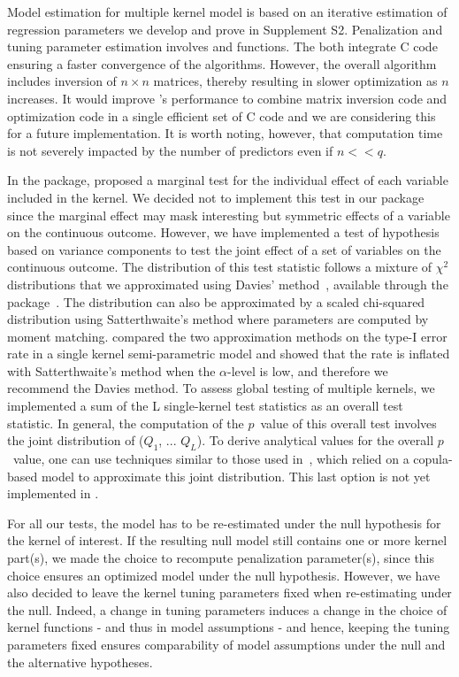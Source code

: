 Model estimation for multiple kernel model is based on an iterative estimation of regression parameters we develop and prove in Supplement S2. Penalization and tuning parameter estimation involves  and  functions. The both integrate C code ensuring a faster convergence of the algorithms. However, the overall  algorithm includes inversion of $n \times n$ matrices, thereby resulting in slower optimization as $n$ increases. It would improve 's performance to combine matrix inversion code and optimization code in a single efficient set of C code and we are considering this for a future implementation.  It is worth noting, however, that computation time is not severely impacted by the number of predictors even if $n << q$.



In the  package, \cite{hainmueller2013kernel} proposed a marginal test for the individual effect of each variable included in the kernel. We decided not to implement this test in our package since the marginal effect may mask interesting but symmetric effects of a variable on the continuous outcome. However, we have implemented a test of hypothesis based on variance components to test the joint effect of a set of variables on the continuous outcome. The distribution of this test statistic follows a mixture of $\chi^2$ distributions that we approximated using Davies' method~\citep{davies1980distribution}, available through the  package~\citep{CQFpackage, compQuadForm}. The distribution can also be approximated by a scaled chi-squared distribution using Satterthwaite's method where parameters are computed by moment matching. \cite{schifano2012snp} compared the two approximation methods on the type-I error rate in a single kernel semi-parametric model and showed that the rate is inflated with Satterthwaite's method when the $\alpha$-level is low, and therefore we recommend the Davies method. To assess global testing of multiple kernels, we implemented a sum of the L single-kernel test statistics as an overall test statistic. In general, the computation of the $p$~value of this overall test involves the joint distribution of ($Q_1$, ... $Q_L$). To derive analytical values for the overall $p$~value, one can use techniques similar to those used in~\cite{sun2018}, which relied on a copula-based model to approximate this joint distribution. This last option is not yet implemented in .



For all our tests, the model has to be re-estimated under the null hypothesis for the kernel of interest. If the resulting null model still contains one or more kernel part(s), we made the choice to recompute penalization parameter(s), since this choice ensures an optimized model under the null hypothesis. However, we have also decided to leave the kernel tuning parameters fixed when re-estimating under the null. Indeed, a change in tuning parameters induces a change in the choice of kernel functions - and thus in model assumptions - and hence, keeping the tuning parameters fixed ensures comparability of model assumptions under the null and the alternative hypotheses. 

